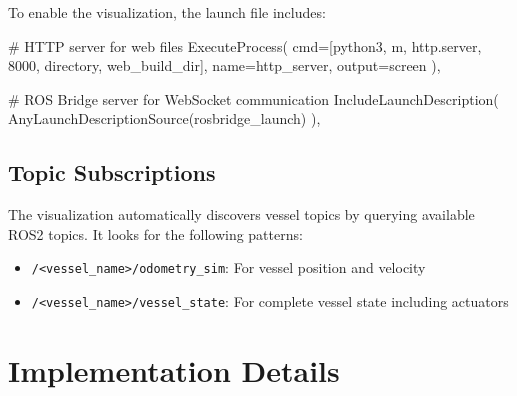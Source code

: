 \documentclass[
  letterpaper,
  DIV=11,
  numbers=noendperiod]{scrreprt}
\newenvironment{Shaded}{\begin{snugshade}}{\end{snugshade}}
\newcommand{\CommentTok}[1]{\textcolor[rgb]{0.37,0.37,0.37}{#1}}
\newcommand{\NormalTok}[1]{\textcolor[rgb]{0.00,0.23,0.31}{#1}}
\newcommand{\OperatorTok}[1]{\textcolor[rgb]{0.37,0.37,0.37}{#1}}
\newcommand{\StringTok}[1]{\textcolor[rgb]{0.13,0.47,0.30}{#1}}
\providecommand{\tightlist}{%
  \setlength{\itemsep}{0pt}\setlength{\parskip}{0pt}}\usepackage{longtable,booktabs,array}
\begin{document}
To enable the visualization, the launch file includes:

\begin{Shaded}
\begin{Highlighting}[]
\CommentTok{\# HTTP server for web files}
\NormalTok{ExecuteProcess(}
\NormalTok{    cmd}\OperatorTok{=}\NormalTok{[}\StringTok{\textquotesingle{}python3\textquotesingle{}}\NormalTok{, }\StringTok{\textquotesingle{}{-}m\textquotesingle{}}\NormalTok{, }\StringTok{\textquotesingle{}http.server\textquotesingle{}}\NormalTok{, }\StringTok{\textquotesingle{}8000\textquotesingle{}}\NormalTok{, }\StringTok{\textquotesingle{}{-}{-}directory\textquotesingle{}}\NormalTok{, web\_build\_dir],}
\NormalTok{    name}\OperatorTok{=}\StringTok{\textquotesingle{}http\_server\textquotesingle{}}\NormalTok{,}
\NormalTok{    output}\OperatorTok{=}\StringTok{\textquotesingle{}screen\textquotesingle{}}
\NormalTok{),}

\CommentTok{\# ROS Bridge server for WebSocket communication}
\NormalTok{IncludeLaunchDescription(}
\NormalTok{    AnyLaunchDescriptionSource(rosbridge\_launch)}
\NormalTok{),}
\end{Highlighting}
\end{Shaded}

\subsection*{Topic Subscriptions}\label{topic-subscriptions}

The visualization automatically discovers vessel topics by querying
available ROS2 topics. It looks for the following patterns:

\begin{itemize}
\tightlist
\item
  \texttt{/\textless{}vessel\_name\textgreater{}/odometry\_sim}: For
  vessel position and velocity
\item
  \texttt{/\textless{}vessel\_name\textgreater{}/vessel\_state}: For
  complete vessel state including actuators
\end{itemize}

\section*{Implementation Details}\label{implementation-details}

\end{document}
